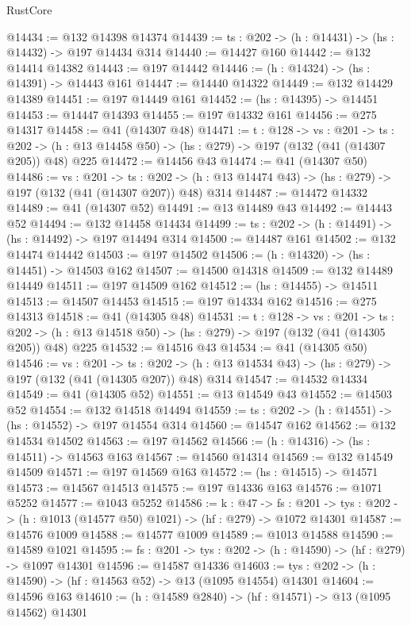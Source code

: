 \begin{lexlean}{RustCore}
\begin{coremodule}
@14434 := @132 @14398 @14374
@14439 := {ts : @202} -> (h : @14431) -> (hs : @14432) -> @197 @14434 @314
@14440 := @14427 @160
@14442 := @132 @14414 @14382
@14443 := @197 @14442
@14446 := (h : @14324) -> (hs : @14391) -> @14443 @161
@14447 := @14440 @14322
@14449 := @132 @14429 @14389
@14451 := @197 @14449 @161
@14452 := (hs : @14395) -> @14451
@14453 := @14447 @14393
@14455 := @197 @14332 @161
@14456 := @275 @14317
@14458 := @41 (@14307 @48)
@14471 := {t : @128} ->
  {vs : @201} ->
  {ts : @202} -> (h : @13 @14458 @50) -> (hs : @279) -> @197 (@132 (@41 (@14307 @205)) @48) @225
@14472 := @14456 @43
@14474 := @41 (@14307 @50)
@14486 := {vs : @201} ->
  {ts : @202} -> (h : @13 @14474 @43) -> (hs : @279) -> @197 (@132 (@41 (@14307 @207)) @48) @314
@14487 := @14472 @14332
@14489 := @41 (@14307 @52)
@14491 := @13 @14489 @43
@14492 := @14443 @52
@14494 := @132 @14458 @14434
@14499 := {ts : @202} -> (h : @14491) -> (hs : @14492) -> @197 @14494 @314
@14500 := @14487 @161
@14502 := @132 @14474 @14442
@14503 := @197 @14502
@14506 := (h : @14320) -> (hs : @14451) -> @14503 @162
@14507 := @14500 @14318
@14509 := @132 @14489 @14449
@14511 := @197 @14509 @162
@14512 := (hs : @14455) -> @14511
@14513 := @14507 @14453
@14515 := @197 @14334 @162
@14516 := @275 @14313
@14518 := @41 (@14305 @48)
@14531 := {t : @128} ->
  {vs : @201} ->
  {ts : @202} -> (h : @13 @14518 @50) -> (hs : @279) -> @197 (@132 (@41 (@14305 @205)) @48) @225
@14532 := @14516 @43
@14534 := @41 (@14305 @50)
@14546 := {vs : @201} ->
  {ts : @202} -> (h : @13 @14534 @43) -> (hs : @279) -> @197 (@132 (@41 (@14305 @207)) @48) @314
@14547 := @14532 @14334
@14549 := @41 (@14305 @52)
@14551 := @13 @14549 @43
@14552 := @14503 @52
@14554 := @132 @14518 @14494
@14559 := {ts : @202} -> (h : @14551) -> (hs : @14552) -> @197 @14554 @314
@14560 := @14547 @162
@14562 := @132 @14534 @14502
@14563 := @197 @14562
@14566 := (h : @14316) -> (hs : @14511) -> @14563 @163
@14567 := @14560 @14314
@14569 := @132 @14549 @14509
@14571 := @197 @14569 @163
@14572 := (hs : @14515) -> @14571
@14573 := @14567 @14513
@14575 := @197 @14336 @163
@14576 := @1071 @5252
@14577 := @1043 @5252
@14586 := {k : @47} ->
  {fs : @201} -> {tys : @202} -> (h : @1013 (@14577 @50) @1021) -> (hf : @279) -> @1072 @14301
@14587 := @14576 @1009
@14588 := @14577 @1009
@14589 := @1013 @14588
@14590 := @14589 @1021
@14595 := {fs : @201} -> {tys : @202} -> (h : @14590) -> (hf : @279) -> @1097 @14301
@14596 := @14587 @14336
@14603 := {tys : @202} -> (h : @14590) -> (hf : @14563 @52) -> @13 (@1095 @14554) @14301
@14604 := @14596 @163
@14610 := (h : @14589 @2840) -> (hf : @14571) -> @13 (@1095 @14562) @14301

\end{coremodule}
\end{lexlean}
